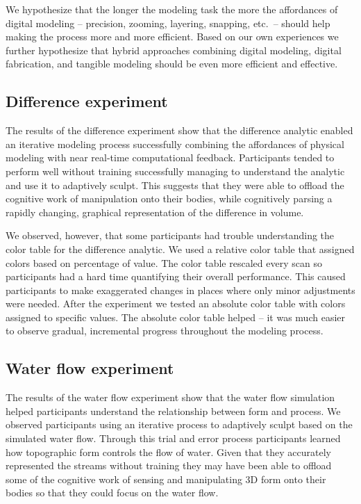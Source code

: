 \documentclass[prodmode,acmtochi]{acmsmall} %
\begin{document}
%
We hypothesize that the longer the modeling task
the more the affordances of digital modeling
-- precision, zooming, layering, snapping, etc.~--
should help
making the process more and more efficient. 
%
Based on our own experiences
we further hypothesize that 
hybrid approaches combining 
digital modeling, digital fabrication, and tangible modeling 
should be even more efficient and effective. 


\subsection{Difference experiment} %
The results of the difference experiment show that 
the difference analytic 
enabled an iterative modeling process
successfully combining the affordances of physical modeling
with near real-time computational feedback. 
%
Participants tended to perform well without training 
successfully managing to %
understand the analytic
and use it to adaptively sculpt.
%
This suggests that they were able to offload the cognitive work 
of manipulation onto their bodies, while cognitively 
parsing a rapidly changing, graphical representation of the difference in volume.

We observed, however, that some participants had trouble understanding
the color table for the difference analytic. 
We used a relative color table 
that assigned colors based on percentage of value.
The color table rescaled every scan 
so participants had a hard time quantifying their overall performance.
This caused participants to make exaggerated changes in places
where only minor adjustments were needed.
%
After the experiment we tested an absolute color table
with colors assigned to specific values.
The absolute color table helped -- it was much easier 
to observe gradual, incremental progress throughout the modeling process.

\subsection{Water flow experiment} %
The results of the water flow experiment show 
that the water flow simulation helped participants 
understand the relationship between form and process.
We observed participants using an iterative process
to adaptively sculpt based on the simulated water flow. 
Through this trial and error process 
participants learned how
topographic form controls the flow of water.
%
Given that they accurately represented the streams without training
they may have been able to offload 
some of the cognitive work of sensing and manipulating 
3D form onto their bodies so that 
they could focus on the water flow. 
\end{document}
